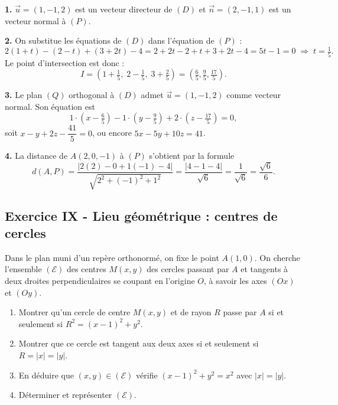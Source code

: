 \documentclass[12pt,a4paper]{article}
\begin{document}
\begin{boitecorrige}
\textbf{1.} $\vec{u} = (1, -1, 2)$ est un vecteur directeur de $(D)$ et $\vec{n} = (2, -1, 1)$ est un vecteur normal à $(P)$.

\textbf{2.} On substitue les équations de $(D)$ dans l'équation de $(P)$ :
\[
2(1+t) - (2-t) + (3+2t) - 4 = 2+2t-2+t+3+2t-4 = 5t - 1 = 0 \;\Rightarrow\; t = \tfrac{1}{5}.
\]
Le point d'intersection est donc :
\[
I = \left(1+\tfrac{1}{5},\; 2-\tfrac{1}{5},\; 3+\tfrac{2}{5}\right) = \left(\tfrac{6}{5}, \tfrac{9}{5}, \tfrac{17}{5}\right).
\]

\textbf{3.} Le plan $(Q)$ orthogonal à $(D)$ admet $\vec{u} = (1, -1, 2)$ comme vecteur normal. Son équation est
\[
1\cdot\!\left(x-\tfrac{6}{5}\right) - 1\cdot\!\left(y-\tfrac{9}{5}\right) + 2\cdot\!\left(z-\tfrac{17}{5}\right) = 0,
\]
soit $x - y + 2z - \dfrac{41}{5} = 0$, ou encore $5x - 5y + 10z = 41$.

\textbf{4.} La distance de $A(2,0,-1)$ à $(P)$ s'obtient par la formule
\[
d(A, P) = \frac{|2(2) - 0 + 1(-1) - 4|}{\sqrt{2^2+(-1)^2+1^2}} = \frac{|4 - 1 - 4|}{\sqrt{6}} = \frac{1}{\sqrt{6}} = \frac{\sqrt{6}}{6}.
\]

\end{boitecorrige}

\subsection*{Exercice IX - Lieu géométrique : centres de cercles \niveau{\difficile}}

\begin{boiteexercice}
Dans le plan muni d'un repère orthonormé, on fixe le point $A(1,0)$. On cherche l'ensemble $(\mathcal{E})$ des centres $M(x,y)$ des cercles passant par $A$ et tangents à deux droites perpendiculaires se coupant en l'origine $O$, à savoir les axes $(Ox)$ et $(Oy)$.
\begin{enumerate}
  \item Montrer qu'un cercle de centre $M(x,y)$ et de rayon $R$ passe par $A$ si et seulement si $R^2 = (x-1)^2 + y^2$.
  \item Montrer que ce cercle est tangent aux deux axes si et seulement si $R = |x| = |y|$.
  \item En déduire que $(x,y)\in(\mathcal{E})$ vérifie $(x-1)^2 + y^2 = x^2$ avec $|x| = |y|$.
  \item Déterminer et représenter $(\mathcal{E})$.
\end{enumerate}
\end{boiteexercice}
\end{document}
